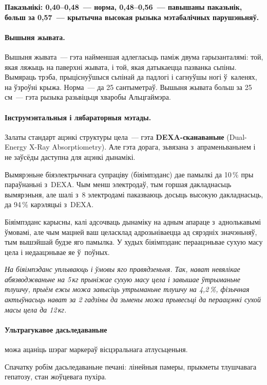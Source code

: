\textbf{Паказьнікі: 0,40--0,48~--- норма, 0,48--0,56~--- павышаны паказьнік, больш за 0,57~--- крытычна высокая рызыка мэтабалічных парушэньняў.}

\paragraph{Вышыня жывата.} Вышыня жывата~--- гэта найменшая адлегласьць паміж двума гарызанталямі: той, якая ляжыць на паверхні жывата, і той, якая датыкаецца пазванка сьпіны. Вымяраць трэба, прыціснуўшыся сьпінай да падлогі і сагнуўшы ногі ў~каленях, на ўзроўні крыжа. Норма~--- да 25 сантыметраў. Вышыня жывата больш за 25\,см~--- гэта рызыка разьвіцьця хваробы Альцгаймэра.

\paragraph{Інструмэнтальныя і лябараторныя мэтады.} Залаты стандарт ацэнкі структуры цела~--- гэта \textbf{DEXA-сканаваньне} (Dual-Energy X-Ray Absorptiometry). Але гэта дорага, зьвязана з~апраменьваньнем і не заўсёды даступна для ацэнкі дынамікі. 

Вымярэньне біяэлектрычнага супраціву (біяімпэданс) дае памылкі да 10\,\% пры параўнаньні з~DEXA. Чым менш электродаў, тым горшая дакладнасьць вымярэньня, але шалі з~8 электродамі паказваюць досыць высокую дакладнасьць, да 94\,\% карэляцыі з~DEXA.

Біяімпэданс карысны, калі адсочваць дынаміку на адным апараце з~аднолькавымі ўмовамі, але чым мацней ваш целасклад адрозьніваецца ад сярэдніх значэньняў, тым вышэйшай будзе яго памылка. У худых біяімпэданс пераацэньвае сухую масу цела і недаацэньвае яе ў~поўных.

\emph{На біяімпэданс уплываюць і ўмовы яго правядзеньня. Так, нават невялікае абязводжваньне на 5\,кг прыніжае сухую масу цела і завышае ўтрыманьне тлушчу, прыём ежы можа завысіць утрыманьне тлушчу на 4,2\,\%, фізычная актыўнасьць нават за 2 гадзіны да зьмены можа прывесьці да пераацэнкі сухой масы цела да 12\,кг.}

\paragraph{Ультрагукавое дасьледаваньне} можа ацаніць шэраг маркераў вісцэральнага атлусьценьня. 

Спачатку робім дасьледаваньне печані: лінейныя памеры, прыкметы тлушчавага гепатозу, стан жоўцевага пухіра.

